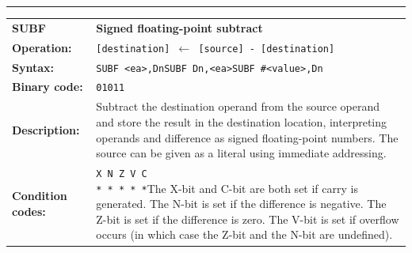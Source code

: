 \documentclass[]{article}
\begin{document}
\begin{appendices}
\noindent\rule{10cm}{1pt}\newline %
\setlength\extrarowheight{5pt} %
\begin{tabularx}{\textwidth}{lL}
  {\Large \textbf{SUBF}} 	& {\Large \textbf{Signed floating-point subtract}}\\
  \textbf{Operation:} 		& \texttt{[destination] $\leftarrow$ [source] - [destination]}\\
  \textbf{Syntax:}  		& \texttt{SUBF <ea>,Dn}\newline\texttt{SUBF Dn,<ea>}\newline\texttt{SUBF \#<value>,Dn}\\
  \textbf{Binary code:} 	& \texttt{01011}\\
  \textbf{Description:}  	& Subtract the destination operand from the source operand and store the
result in the destination location, interpreting operands and difference as signed floating-point numbers. The source can be given as a literal using immediate addressing.\\
  \textbf{Condition codes:} & \texttt{X N Z V C\newline * * * * *}\newline\newline The X-bit and C-bit are both set if carry is generated. The N-bit is set if the difference is negative. The Z-bit is set if the difference is zero. The V-bit is set if overflow occurs (in which case the Z-bit and the N-bit are undefined).\\
\end{tabularx}
\newline

\newpage


\end{appendices}
\end{document}
